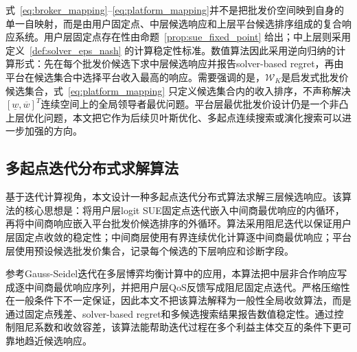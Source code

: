 \documentclass[UTF8,11pt]{ctexart}
\begin{document}
式~\eqref{eq:broker_mapping}--\eqref{eq:platform_mapping}并不是把批发价空间映到自身的单一自映射，而是由用户固定点、中层候选响应和上层平台候选排序组成的复合响应系统。用户层固定点存在性由命题~\ref{prop:sue_fixed_point} 给出；中上层则采用定义~\ref{def:solver_eps_nash} 的计算稳定性标准。数值算法因此采用逆向归纳的计算形式：先在每个批发价候选下求中层候选响应并报告solver-based regret，再由平台在候选集合中选择平台收入最高的响应。需要强调的是，$\mathcal{W}_K$是启发式批发价候选集合，式~\eqref{eq:platform_mapping} 只定义候选集合内的收入排序，不声称解决$[\underline w,\overline w]^T$连续空间上的全局领导者最优问题。平台层最优批发价设计仍是一个非凸上层优化问题，本文把它作为后续贝叶斯优化、多起点连续搜索或演化搜索可以进一步加强的方向。

\subsection{多起点迭代分布式求解算法}
\label{sec:algorithm}

基于迭代计算视角，本文设计一种多起点迭代分布式算法求解三层候选响应。该算法的核心思想是：将用户层logit SUE固定点迭代嵌入中间商最优响应的内循环，再将中间商响应嵌入平台批发价候选排序的外循环。算法采用阻尼迭代以保证用户层固定点收敛的稳定性；中间商层使用有界连续优化计算逐中间商最优响应；平台层使用预设候选批发价集合，记录每个候选的下层响应和诊断字段。

参考Gauss-Seidel迭代在多层博弈均衡计算中的应用\cite{wang2026hierarchical}，本算法把中层非合作响应写成逐中间商最优响应序列，并把用户层QoS反馈写成阻尼固定点迭代。严格压缩性在一般条件下不一定保证，因此本文不把该算法解释为一般性全局收敛算法，而是通过固定点残差、solver-based regret和多候选搜索结果报告数值稳定性。通过控制阻尼系数和收敛容差，该算法能帮助迭代过程在多个利益主体交互的条件下更可靠地趋近候选响应。
\end{document}
